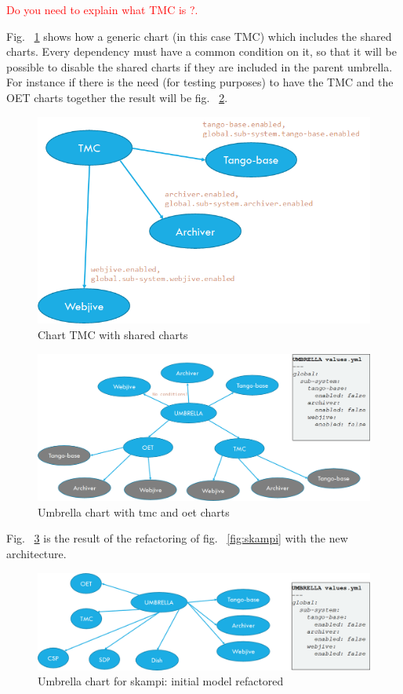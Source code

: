 \documentclass[a4paper]{spie}  %
\begin{document}
\textcolor{red}{Do you need to explain what TMC is ?.}

Fig. ~\ref{fig:tmc_shared_charts} shows how a generic chart (in this case TMC) which includes the shared charts. Every dependency must have a common condition on it, so that it will be possible to disable the shared charts if they are included in the parent umbrella. For instance if there is the need (for testing purposes) to have the TMC and the OET charts together the result will be fig. ~\ref{fig:tmc_oet_umbrella}.

\begin{figure}[!htb]
   \centering
   \includegraphics*[width=0.5\columnwidth]{tmc_shared_charts}
   \caption{Chart TMC with shared charts}
   \label{fig:tmc_shared_charts}
\end{figure}

\begin{figure}[!htb]
   \centering
   \includegraphics*[width=0.8\columnwidth]{tmc_oet_umbrella}
   \caption{Umbrella chart with tmc and oet charts}
   \label{fig:tmc_oet_umbrella}
\end{figure}

Fig. ~\ref{fig:umbrella_skampi} is the result of the refactoring of fig. ~\ref{fig:skampi} with the new architecture.

\begin{figure}[!htb]
   \centering
   \includegraphics*[width=1\columnwidth]{umbrella_skampi}
   \caption{Umbrella chart for skampi: initial model refactored}
   \label{fig:umbrella_skampi}
\end{figure}
\end{document}
